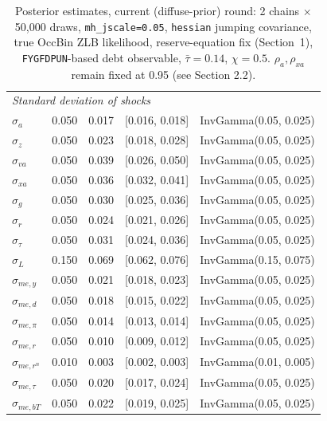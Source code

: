 \documentclass[]{article}
\begin{document}
\begin{table}[h]
\begin{tabular}{lrrrl}
\midrule
\multicolumn{5}{l}{\textit{Standard deviation of shocks}} \\
$\sigma_a$   & 0.050 & 0.017 & [0.016, 0.018] & InvGamma(0.05, 0.025) \\
$\sigma_z$   & 0.050 & 0.023 & [0.018, 0.028] & InvGamma(0.05, 0.025) \\
$\sigma_{va}$& 0.050 & 0.039 & [0.026, 0.050] & InvGamma(0.05, 0.025) \\
$\sigma_{xa}$& 0.050 & 0.036 & [0.032, 0.041] & InvGamma(0.05, 0.025) \\
$\sigma_g$   & 0.050 & 0.030 & [0.025, 0.036] & InvGamma(0.05, 0.025) \\
$\sigma_r$   & 0.050 & 0.024 & [0.021, 0.026] & InvGamma(0.05, 0.025) \\
$\sigma_\tau$& 0.050 & 0.031 & [0.024, 0.036] & InvGamma(0.05, 0.025) \\
$\sigma_L$ & 0.150 & 0.069 & [0.062, 0.076] & InvGamma(0.15, 0.075) \\
$\sigma_{me,y}$   & 0.050 & 0.021 & [0.018, 0.023] & InvGamma(0.05, 0.025) \\
$\sigma_{me,d}$   & 0.050 & 0.018 & [0.015, 0.022] & InvGamma(0.05, 0.025) \\
$\sigma_{me,\pi}$ & 0.050 & 0.014 & [0.013, 0.014] & InvGamma(0.05, 0.025) \\
$\sigma_{me,r}$   & 0.050 & 0.010 & [0.009, 0.012] & InvGamma(0.05, 0.025) \\
$\sigma_{me,r^n}$ & 0.010 & 0.003 & [0.002, 0.003] & InvGamma(0.01, 0.005) \\
$\sigma_{me,\tau}$& 0.050 & 0.020 & [0.017, 0.024] & InvGamma(0.05, 0.025) \\
$\sigma_{me,bT}$  & 0.050 & 0.022 & [0.019, 0.025] & InvGamma(0.05, 0.025) \\
\bottomrule
\end{tabular}
\caption{Posterior estimates, current (diffuse-prior) round: 2 chains
$\times$ 50{,}000 draws, \texttt{mh\_jscale=0.05}, \texttt{hessian}
jumping covariance, true OccBin ZLB likelihood, reserve-equation fix
(Section~1), \texttt{FYGFDPUN}-based debt observable, $\bar\tau=0.14$,
$\chi=0.5$. $\rho_a,\rho_{xa}$ remain fixed at 0.95 (see Section 2.2).}
\label{tab:posteriors}
\end{table}
\end{document}
